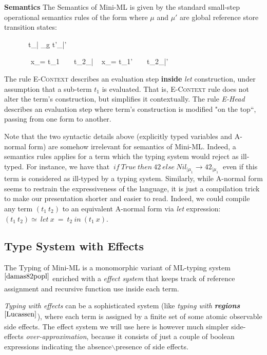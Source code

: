 \documentclass[a4paper,11pt,oneside]{article}
\theoremstyle{plain}
\newcommand{\evalstep}[4]{~#1_{|\mu_#2} \rightarrow #3_{|\mu_#4} ~}
\newcommand{\mem}{_{|\mu}}\newcommand{\memp}{_{|\mu'}}
\newcommand{\geval}[4]{~#1_{|#2} \rightarrow_{g\lambda} #3_{|#4} ~}
\newcommand{\gevalh}[4]{~#1_{|#2} \stackrel{\epsilon}{\rightarrow}_{g\lambda} #3_{|#4} ~}
\begin{document}
\noindent	\textbf{Semantics}	\indent  
	The Semantics of Mini-ML is given by the standard small-step operational semantics rules of the form  where $\mu$ and $\mu'$ are global reference store transition states:	
	\begin{figure}[H]
	\begin{spacing}{1.2} 	
	
	\infrule[E-Head]
	{\gevalh{t}{\mu}{t'}{\mu'}}
	{\geval{t}{\mu}{t'}{\mu'}}
	
	\infrule[E-Context]
	{{t_{1}}\mem \rightarrow {{t'}_{1}}\memp}
	{ ~ x_\tau = t_{1} ~ ~ {t_{2}}\mem
		\rightarrow 
		 ~ x_\tau = t_{1}' ~ ~ {t_{2}}\memp}
\end{spacing}
\label{mini-ml-def-sem}
\end{figure}
	The rule \textsc{E-Context} describes an evaluation step \textbf{inside} \textit{let} construction, under assumption that a sub-term $t_1$ is evaluated.
	That is, \textsc{E-Context} rule does not alter the term's construction, but simplifies it contextually.
	The rule \textit{E-Head} describes an evaluation step where term's construction is modified "on the top``, passing from one form to another.
	
	Note that the two syntactic details above (explicitly typed variables and A-normal form) are somehow irrelevant for semantics of Mini-ML.
	Indeed, a semantics rules applies for a term which the typing system would reject as ill-typed. For instance, we have that 
	$\evalstep{if~True~then~42~else~Nil}{1}{42}{1}$ 
	even if this term is considered as ill-typed by a typing system.
	Similarly, while A-normal form seems to restrain the expressiveness of the language, it is just a compilation trick to make our presentation shorter and easier to read. 
	Indeed, we could compile any term $(t_1~t_2)$ to an equivalent A-normal form via \textit{let} expression: $(t_1~t_2) \simeq~let~x~=~t_2~in~(t_1~x)$.

\subsection{Type System with Effects}
	The Typing of Mini-ML is a monomorphic variant of ML-typing system$^{\cite{damas82popl}}$ enriched with a \textit{effect system} that keeps track of reference assignment and recursive function use inside each term.

	\textit{Typing with effects} can be a sophisticated system (like  \textit{typing with \textbf{regions}}$^{\cite{Lucassen}}$), where each term is assigned by a finite set of some atomic observable side effects.	
	The effect system we will use here is however much simpler side-effects \textit{over-approximation}, because it consists of just a couple of boolean expressions indicating the absence$\backslash$presence of side effects.
	
\end{document}

